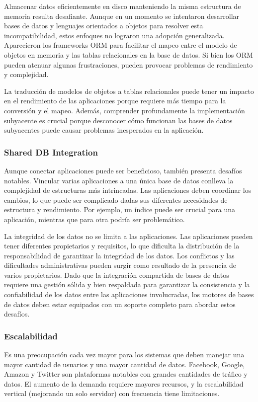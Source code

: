 \documentclass{article}
\begin{document}
		Almacenar datos eficientemente en disco manteniendo la misma estructura de memoria resulta desafiante. Aunque en un momento se intentaron desarrollar bases de datos y lenguajes orientados a objetos para resolver esta incompatibilidad, estos enfoques no lograron una adopción generalizada. Aparecieron los frameworks ORM para facilitar el mapeo entre el modelo de objetos en memoria y las tablas relacionales en la base de datos. Si bien los ORM pueden atenuar algunas frustraciones, pueden provocar problemas de rendimiento y complejidad.
		
		La traducción de modelos de objetos a tablas relacionales puede tener un impacto en el rendimiento de las aplicaciones porque requiere más tiempo para la conversión y el mapeo. Además, comprender profundamente la implementación subyacente es crucial porque desconocer cómo funcionan las bases de datos subyacentes puede causar problemas inesperados en la aplicación.
		
		\subsubsection{Shared DB Integration}
		Aunque conectar aplicaciones puede ser beneficioso, también presenta desafíos notables. Vincular varias aplicaciones a una única base de datos conlleva la complejidad de estructuras más intrincadas. Las aplicaciones deben coordinar los cambios, lo que puede ser complicado dadas sus diferentes necesidades de estructura y rendimiento. Por ejemplo, un índice puede ser crucial para una aplicación, mientras que para otra podría ser problemático.
		
		La integridad de los datos no se limita a las aplicaciones. Las aplicaciones pueden tener diferentes propietarios y requisitos, lo que dificulta la distribución de la responsabilidad de garantizar la integridad de los datos. Los conflictos y las dificultades administrativas pueden surgir como resultado de la presencia de varios propietarios. Dado que la integración compartida de bases de datos requiere una gestión sólida y bien respaldada para garantizar la consistencia y la confiabilidad de los datos entre las aplicaciones involucradas, los motores de bases de datos deben estar equipados con un soporte completo para abordar estos desafíos.
		
				
		\subsubsection{Escalabilidad}
		Es una preocupación cada vez mayor para los sistemas que deben manejar una mayor cantidad de usuarios y una mayor cantidad de datos. Facebook, Google, Amazon y Twitter son plataformas notables con grandes cantidades de tráfico y datos. El aumento de la demanda requiere mayores recursos, y la escalabilidad vertical (mejorando un solo servidor) con frecuencia tiene limitaciones.
		
\end{document}
